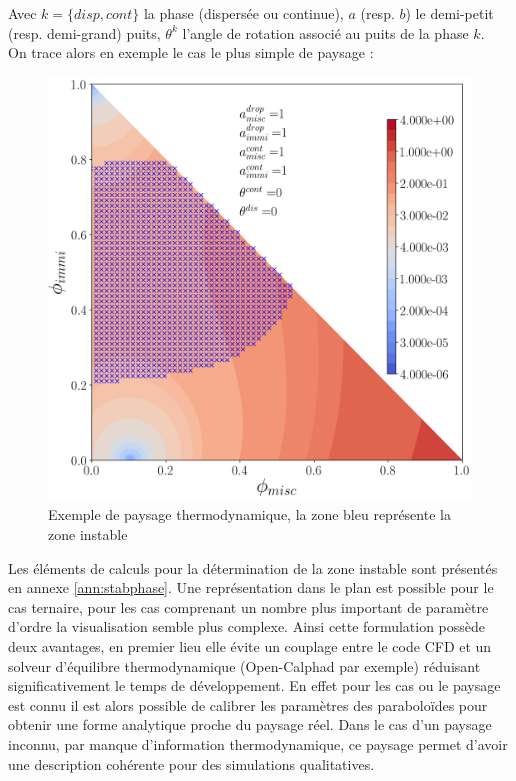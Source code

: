 Avec $k = \{disp,cont\}$ la phase (dispersée ou continue), $a$ (resp. $b$) le demi-petit (resp. demi-grand) puits, $\theta^k$ l'angle de rotation associé au puits de la phase $k$.\\
On trace alors en exemple le cas le plus simple de paysage :
\begin{figure}[H]
	\centering
	\includegraphics[width=0.6\linewidth]{figure/landscape}
	\caption{Exemple de paysage thermodynamique, la zone bleu représente la zone instable}
	\label{fig:landscape}
\end{figure}
Les éléments de calculs pour la détermination de la zone instable sont présentés en annexe \ref{ann:stabphase}. Une représentation dans le plan est possible pour le cas ternaire, pour les cas comprenant un nombre plus important de paramètre d'ordre la visualisation semble plus complexe. Ainsi cette formulation possède deux avantages, en premier lieu elle évite un couplage entre le code CFD et un solveur d'équilibre thermodynamique (Open-Calphad par exemple) réduisant significativement le temps de développement. En effet pour les cas ou le paysage est connu il est alors possible de calibrer les paramètres des paraboloïdes pour obtenir une forme analytique proche du paysage réel. Dans le cas d'un paysage inconnu, par manque d'information thermodynamique, ce paysage permet d'avoir une description cohérente pour des simulations qualitatives.
